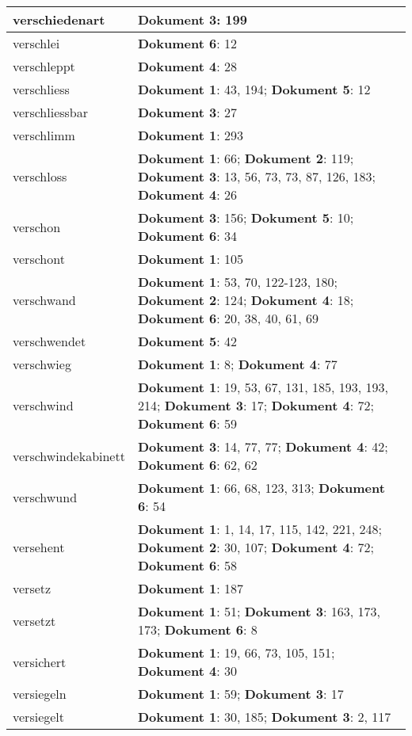 \documentclass[a5paper]{article}
\begin{document}
\begin{longtable}[l]{|l|p{3in}|}
\hline
verschiedenart & \textbf{Dokument 3}: 199 \\
\hline
verschlei & \textbf{Dokument 6}: 12 \\
\hline
verschleppt & \textbf{Dokument 4}: 28 \\
\hline
verschliess & \textbf{Dokument 1}: 43, 194; \textbf{Dokument 5}: 12 \\
\hline
verschliessbar & \textbf{Dokument 3}: 27 \\
\hline
verschlimm & \textbf{Dokument 1}: 293 \\
\hline
verschloss & \textbf{Dokument 1}: 66; \textbf{Dokument 2}: 119; \textbf{Dokument 3}: 13, 56, 73, 73, 87, 126, 183; \textbf{Dokument 4}: 26 \\
\hline
verschon & \textbf{Dokument 3}: 156; \textbf{Dokument 5}: 10; \textbf{Dokument 6}: 34 \\
\hline
verschont & \textbf{Dokument 1}: 105 \\
\hline
verschwand & \textbf{Dokument 1}: 53, 70, 122-123, 180; \textbf{Dokument 2}: 124; \textbf{Dokument 4}: 18; \textbf{Dokument 6}: 20, 38, 40, 61, 69 \\
\hline
verschwendet & \textbf{Dokument 5}: 42 \\
\hline
verschwieg & \textbf{Dokument 1}: 8; \textbf{Dokument 4}: 77 \\
\hline
verschwind & \textbf{Dokument 1}: 19, 53, 67, 131, 185, 193, 193, 214; \textbf{Dokument 3}: 17; \textbf{Dokument 4}: 72; \textbf{Dokument 6}: 59 \\
\hline
verschwindekabinett & \textbf{Dokument 3}: 14, 77, 77; \textbf{Dokument 4}: 42; \textbf{Dokument 6}: 62, 62 \\
\hline
verschwund & \textbf{Dokument 1}: 66, 68, 123, 313; \textbf{Dokument 6}: 54 \\
\hline
versehent & \textbf{Dokument 1}: 1, 14, 17, 115, 142, 221, 248; \textbf{Dokument 2}: 30, 107; \textbf{Dokument 4}: 72; \textbf{Dokument 6}: 58 \\
\hline
versetz & \textbf{Dokument 1}: 187 \\
\hline
versetzt & \textbf{Dokument 1}: 51; \textbf{Dokument 3}: 163, 173, 173; \textbf{Dokument 6}: 8 \\
\hline
versichert & \textbf{Dokument 1}: 19, 66, 73, 105, 151; \textbf{Dokument 4}: 30 \\
\hline
versiegeln & \textbf{Dokument 1}: 59; \textbf{Dokument 3}: 17 \\
\hline
versiegelt & \textbf{Dokument 1}: 30, 185; \textbf{Dokument 3}: 2, 117 \\

\end{longtable}
\end{document}
